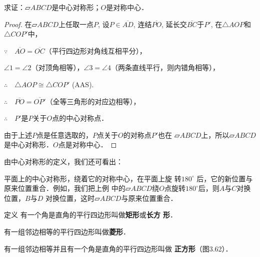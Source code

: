 求证：$\parallelogram ABCD$是中心对称形；$O$是对称中心．

\begin{proof}
    在$\parallelogram ABCD$上任取一点$P$, 设$P\in\overline{AD}$, 连结$\overline{PO}$, 
延长交$\overline{BC}$于$P'$, 在$\triangle AOP$和$\triangle COP'$中，

$\because\quad \overline{AO}=\overline{OC}$（平行四边形对角线互相平分），

$\angle 1=\angle 2$（对顶角相等），$\angle 3=\angle 4$（两条直线平行，则内错角相等），

$\therefore\quad \triangle AOP\cong \triangle COP'$ (AAS).

$\therefore\quad \overline{PO}=\overline{OP'}$（全等三角形的对应边相等），

$\therefore\quad P'$是$P$关于$O$点的中心对称点．

由于上述$P$点是任意选取的，$P$点关于$O$的对称点$P'$也在
$\parallelogram ABCD$上，所以$\parallelogram ABCD$是中心对称形．$O$点是对称中心．
\end{proof}

由中心对称形的定义，我们还可看出：

平面上的中心对称形，绕着它的对称中心，在平面上旋
转$180^{\circ}$ 后，它的新位置与原来位置重合．例如，我们把上例
中的$\parallelogram ABCD$绕$O$点旋转$180^{\circ}$后，则$A$与$C$对换位置，$B$与$D$
对换位置，这时$\parallelogram ABCD$与原来位置重合．

\begin{blk}
    {定义} 有一个角是直角的平行四边形叫做\textbf{矩形}或\textbf{长方
形}．

有一组邻边相等的平行四边形叫做\textbf{菱形}．

有一组邻边相等并且有一个角是直角的平行四边形叫做
\textbf{正方形}（图3.62）．
\end{blk}

\begin{figure}[htp]
    \centering
{}
    \caption{}
\end{figure}

